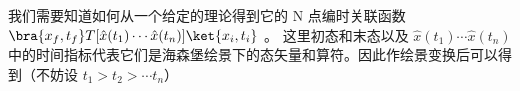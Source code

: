 
我们需要知道如何从一个给定的理论得到它的 N 点编时关联函数
 $\bra{x_f,t_f} T[\hat x(t_1)\cdots \hat x(t_n)]\ket{x_i,t_i}$ 。
这里初态和末态以及 $\hat x(t_1)\cdots \hat x(t_n)$ 中的时间指标代表它们是海森堡绘景下的态矢量和算符。因此作绘景变换后可以得到（不妨设 $t_1>t_2>\cdots t_n$）